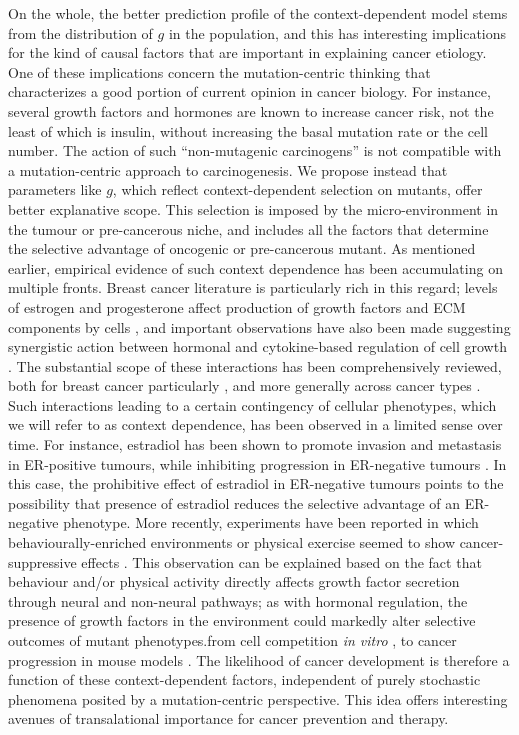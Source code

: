 \documentclass[9pt,twocolumn,twoside]{pnas-new}
\begin{document}
On the whole, the better prediction profile of the context-dependent model stems from the distribution of $g$ in the population, and this has interesting implications for the kind of causal factors that are important in explaining cancer etiology. One of these implications concern the mutation-centric thinking that characterizes a good portion of current opinion in cancer biology. For instance, several growth factors and hormones are known to increase cancer risk, not the least of which is insulin, without increasing the basal mutation rate or the cell number. The action of such ``non-mutagenic carcinogens'' is not compatible with a mutation-centric approach to carcinogenesis. We propose instead that parameters like $g$, which reflect context-dependent selection on mutants, offer better explanative scope. This selection is imposed by the micro-environment in the tumour or pre-cancerous niche, and includes all the factors that determine the selective advantage of oncogenic or pre-cancerous mutant. As mentioned earlier, empirical evidence of such context dependence has been accumulating on multiple fronts. Breast cancer literature is particularly rich in this regard; levels of estrogen and progesterone affect production of growth factors and ECM components by cells \cite{Haslam2001,Woodward2000,DICKSON1987}, and important observations have also been made suggesting synergistic action between hormonal and cytokine-based regulation of cell growth \cite{Freund2003}. The substantial scope of these interactions has been comprehensively reviewed, both for breast cancer particularly \cite{Hansen2000}, and more generally across cancer types \cite{Pietras2010,Hanahan2012,Cabarcas2011a}. Such interactions leading to a certain contingency of cellular phenotypes, which we will refer to as context dependence, has been observed in a limited sense over time. For instance, estradiol has been shown to promote invasion and metastasis in ER-positive tumours, while inhibiting progression in ER-negative tumours \cite{Garcia1992}. In this case, the prohibitive effect of estradiol in ER-negative tumours points to the possibility that presence of estradiol reduces the selective advantage of an ER-negative phenotype. More recently, experiments have been reported in which behaviourally-enriched environments or physical exercise seemed to show cancer-suppressive effects \cite{Cao2010,Rundqvist2013}. This observation can be explained based on the fact that behaviour and/or physical activity directly affects growth factor secretion through neural and non-neural pathways; as with hormonal regulation, the presence of growth factors in the environment could markedly alter selective outcomes of mutant phenotypes.from cell competition \textit{in vitro} \cite{Archetti2015}, to cancer progression in mouse models \cite{Cao2010}. The likelihood of cancer development is therefore a function of these context-dependent factors, independent of purely stochastic phenomena posited by a mutation-centric perspective. This idea offers interesting avenues of transalational importance for cancer prevention and therapy.
\end{document}
